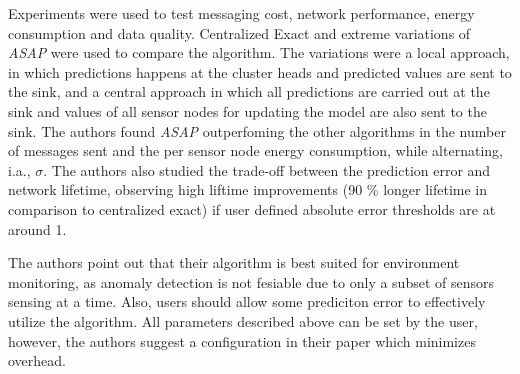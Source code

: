 Experiments were used to test messaging cost, network performance, energy
consumption and data quality. Centralized Exact and extreme variations of
\textit{ASAP} were used to compare the algorithm. The variations were a local
approach, in which predictions happens at the cluster heads and predicted
values are sent to the sink, and a central approach in which all
predictions are carried out at the sink and values of all sensor nodes
for updating the model are also sent to the sink. The authors found
\textit{ASAP} outperfoming the other algorithms in the number of messages sent
and the per sensor node energy consumption, while alternating, i.a., $ \sigma
$. The authors also studied the trade-off between the prediction error and
network lifetime, observing high liftime improvements (90 \% longer lifetime in
comparison to centralized exact) if user defined absolute error thresholds are
at around 1.

The authors point out that their algorithm is best suited for environment
monitoring, as anomaly detection is not fesiable due to only a subset of
sensors sensing at a time. Also, users should allow some prediciton error to
effectively utilize the algorithm. All parameters described above can be set by
the user, however, the authors suggest a configuration in their paper which
minimizes overhead.
\par

